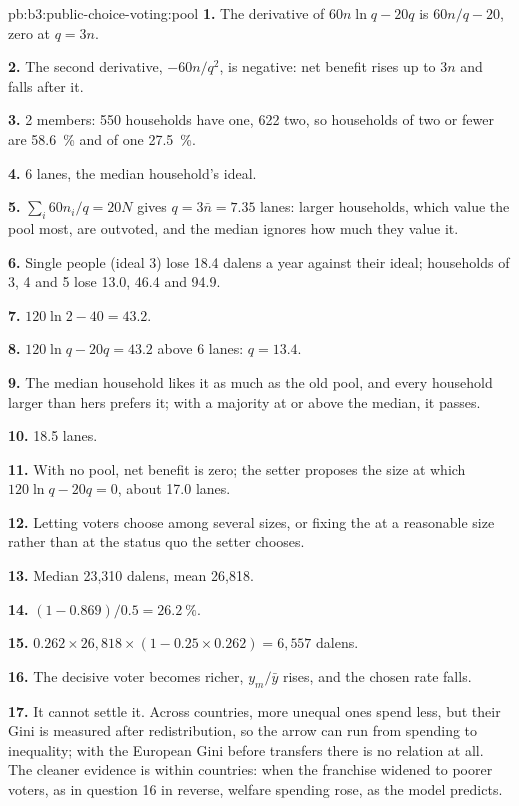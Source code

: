 \begin{solution}{pb:b3:public-choice-voting:pool}
\textbf{1.} The derivative of $60n\ln q - 20q$ is $60n/q - 20$, zero at $q = 3n$.

\textbf{2.} The second derivative, $-60n/q^2$, is negative: net benefit rises up to $3n$ and
falls after it.

\textbf{3.} 2 members: 550 households have one, 622 two, so households of two or fewer are
58.6~\% and of one 27.5~\%.

\textbf{4.} 6 lanes, the median household's ideal.

\textbf{5.} $\sum_i 60n_i/q = 20N$ gives $q = 3\bar n = 7.35$ lanes: larger households, which value the pool
most, are outvoted, and the median ignores how much they value it.

\textbf{6.} Single people (ideal 3) lose 18.4 dalens a year against their ideal; households
of 3, 4 and 5 lose 13.0, 46.4 and 94.9.

\textbf{7.} $120\ln 2 - 40 = 43.2$.

\textbf{8.} $120\ln q - 20q = 43.2$ above 6 lanes: $q = 13.4$.

\textbf{9.} The median household likes it as much as the old pool, and every household
larger than hers prefers it; with a majority at or above the median, it passes.

\textbf{10.} 18.5 lanes.

\textbf{11.} With no pool, net benefit is zero; the setter proposes the size at which
$120\ln q - 20q = 0$, about 17.0 lanes.

\textbf{12.} Letting voters choose among several sizes, or fixing the 
at a reasonable size rather than at the status quo the setter chooses.

\textbf{13.} Median 23{,}310 dalens, mean 26{,}818.

\textbf{14.} $(1 - 0.869)/0.5 = 26.2~\%$.

\textbf{15.} $0.262 \times 26{,}818 \times (1 - 0.25 \times 0.262) = 6{,}557$ dalens.

\textbf{16.} The decisive voter becomes richer, $y_m/\bar y$ rises, and the chosen rate falls.

\textbf{17.} It cannot settle it. Across countries, more unequal ones spend less, but
their Gini is measured after redistribution, so the arrow can run from spending to
inequality; with the European Gini before transfers there is no relation at all.
The cleaner evidence is within countries: when the franchise widened to poorer
voters, as in question 16 in reverse, welfare spending rose, as the model predicts.


\end{solution}
